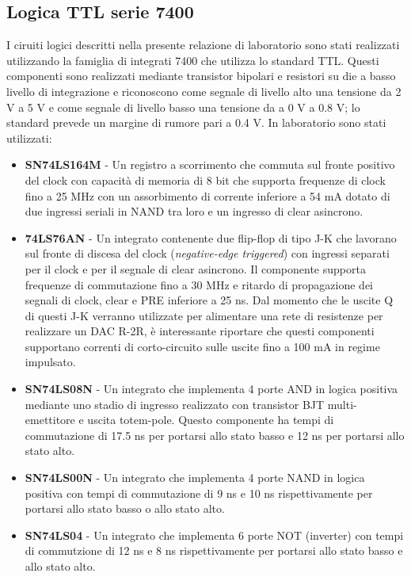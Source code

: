 \documentclass[journal]{IEEEtran}
\begin{document}
\subsection{Logica TTL serie 7400}
I ciruiti logici descritti nella presente relazione di laboratorio sono stati realizzati utilizzando la famiglia di integrati 7400 che utilizza lo standard TTL. Questi componenti sono realizzati mediante transistor bipolari e resistori su die a basso livello di integrazione e riconoscono come segnale di livello alto una tensione da 2 V a 5 V e come segnale di livello basso una tensione da a 0 V a 0.8 V; lo standard prevede un margine di rumore pari a 0.4 V. In laboratorio sono stati utilizzati:
\begin{itemize}
    \item \textbf{SN74LS164M} - Un registro a scorrimento che commuta sul fronte positivo del clock con capacità di memoria di 8 bit che supporta frequenze di clock fino a 25 MHz con un assorbimento di corrente inferiore a 54 mA dotato di due ingressi seriali in NAND tra loro e un ingresso di clear asincrono. \cite{D}
    
    \item \textbf{74LS76AN} - Un integrato contenente due flip-flop di tipo J-K che lavorano sul fronte di discesa del clock (\textit{negative-edge triggered}) con ingressi separati per il clock e per il segnale di clear asincrono. Il componente supporta frequenze di commutazione fino a 30 MHz e ritardo di propagazione dei segnali di clock, clear e PRE inferiore a 25 ns. Dal momento che le uscite Q di questi J-K verranno utilizzate per alimentare una rete di resistenze per realizzare un DAC R-2R, è interessante riportare che questi componenti supportano correnti di corto-circuito sulle uscite fino a 100 mA in regime impulsato.
    \cite{E}
    
    \item \textbf{SN74LS08N} - Un integrato che implementa 4 porte AND in logica positiva mediante uno stadio di ingresso realizzato con transistor BJT multi-emettitore e uscita totem-pole. Questo componente ha tempi di commutazione  di 17.5 ns per portarsi allo stato basso e 12 ns per portarsi allo stato alto.
    \cite{F}
    
    \item \textbf{SN74LS00N} - Un integrato che implementa 4 porte NAND in logica positiva con tempi di commutazione di 9 ns e 10 ns rispettivamente per portarsi allo stato basso o allo stato alto.
    \cite{G}
    
    \item \textbf{SN74LS04} - Un integrato che implementa 6 porte NOT (inverter) con tempi di commutzione di 12 ns e 8 ns rispettivamente per portarsi allo stato basso e allo stato alto.
    \cite{H}
    
\end{itemize}
\end{document}
